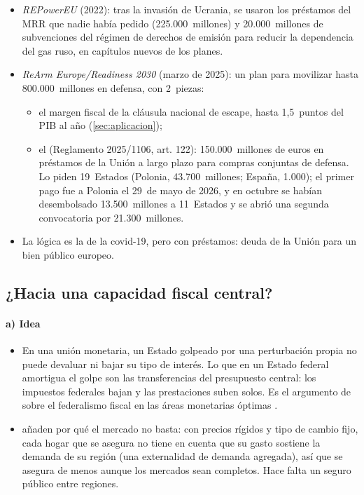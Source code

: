 \documentclass[11pt]{article}
\begin{document}
\begin{itemize}
\item \emph{REPowerEU} (2022): tras la invasión de Ucrania, se usaron los préstamos del MRR que nadie había pedido (225.000~millones) y 20.000~millones de subvenciones del régimen de derechos de emisión para reducir la dependencia del gas ruso, en capítulos nuevos de los planes\nocite{CE2022REPowerEU}.
\item \emph{ReArm Europe/Readiness 2030} (marzo de 2025): un plan para movilizar hasta 800.000~millones en defensa, con 2~piezas\nocite{CE2025Defensa}:
  \begin{itemize}
  \item el margen fiscal de la cláusula nacional de escape, hasta 1,5~puntos del PIB al año (\ref{sec:aplicacion});
  \item el  (Reglamento 2025/1106, art. 122): 150.000~millones de euros en préstamos de la Unión a largo plazo para compras conjuntas de defensa\nocite{UE2025SAFE}. Lo piden 19~Estados (Polonia, 43.700~millones; España, 1.000); el primer pago fue a Polonia el 29~de mayo de 2026, y en octubre se habían desembolsado 13.500~millones a 11~Estados y se abrió una segunda convocatoria por 21.300~millones\nocite{CE2026SAFEPolonia,CE2026SAFE2}.
  \end{itemize}
\item La lógica es la de la covid-19, pero con préstamos: deuda de la Unión para un bien público europeo.
\end{itemize}

\subsection{¿Hacia una capacidad fiscal central?}\label{sec:capacidad}

\paragraph{a) Idea}

\begin{itemize}
\item En una unión monetaria, un Estado golpeado por una perturbación propia no puede devaluar ni bajar su tipo de interés. Lo que en un Estado federal amortigua el golpe son las transferencias del presupuesto central: los impuestos federales bajan y las prestaciones suben solos. Es el argumento de  sobre el federalismo fiscal en las áreas monetarias óptimas  .
\item \textcite{FarhiWerning2017} añaden por qué el mercado no basta: con precios rígidos y tipo de cambio fijo, cada hogar que se asegura no tiene en cuenta que su gasto sostiene la demanda de su región (una externalidad de demanda agregada), así que se asegura de menos aunque los mercados sean completos. Hace falta un seguro público entre regiones.
\end{itemize}
\end{document}
